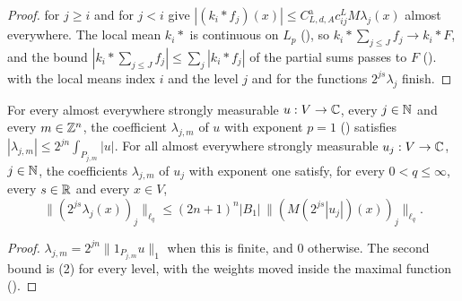\begin{proof}
\leanok
{} for $j \geq i$ and  for
$j < i$ give $|(k_i * f_j)(x)| \leq C^{\mathrm a}_{L,d,A} c^L_{ij} M \lambda_j(x)$ almost
everywhere. The local mean $k_i *$ is continuous on $L_p$ (), so
$k_i * \sum_{j \leq J} f_j \to k_i * F$, and the bound
$|k_i * \sum_{j \leq J} f_j| \leq \sum_j |k_i * f_j|$ of the partial sums passes to $F$
().  with the local means index
$i$ and the level $j$ and  for the functions
$2^{js} \lambda_j$ finish.
\end{proof}

\begin{lemma}
\label{lem:cell-coefficients-exponent-one}
\leanok
{}
For every almost everywhere strongly measurable $u : V \to \mathbb{C}$, every $j \in \mathbb{N}$ and every
$m \in \mathbb{Z}^n$, the coefficient $\lambda_{j,m}$ of $u$ with exponent $p = 1$
() satisfies $|\lambda_{j,m}| \leq 2^{jn} \int_{P_{j,m}} |u|$. For all
almost everywhere strongly measurable $u_j : V \to \mathbb{C}$, $j \in \mathbb{N}$, the coefficients
$\lambda_{j,m}$ of $u_j$ with exponent one satisfy, for every $0 < q \leq \infty$, every
$s \in \mathbb{R}$ and every $x \in V$,
\[
  \|(2^{js} \lambda_j(x))_j\|_{\ell_q} \leq (2n + 1)^n |B_1| \,
  \|(M(2^{js} |u_j|)(x))_j\|_{\ell_q} .
\]
\end{lemma}

\begin{proof}
\leanok
$\lambda_{j,m} = 2^{jn} \|1_{P_{j,m}} u\|_1$ when this is finite, and $0$ otherwise. The second
bound is  (2) for every level, with the weights moved inside the
maximal function ().
\end{proof}

